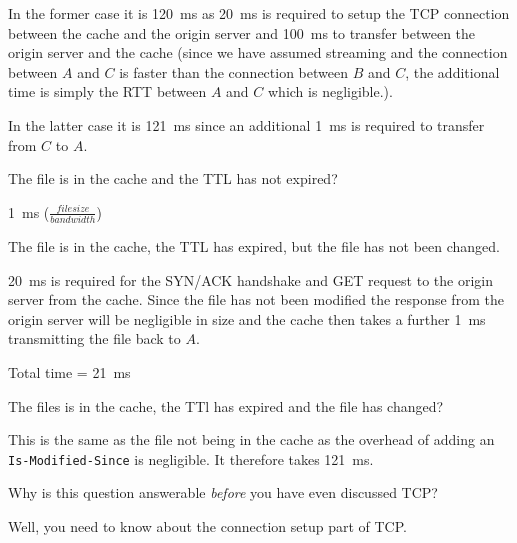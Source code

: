 \documentclass{supervision}
\begin{document}
\begin{questions}
\begin{parts}
\begin{subparts}
\begin{subsubparts}
\begin{solution}
                  In the former case it is \SI{120}{ms} as \SI{20}{ms} is
                  required to setup the TCP connection between the cache and the
                  origin server and \SI{100}{ms} to transfer between the origin
                  server and the cache (since we have assumed streaming and the
                  connection between $A$ and $C$ is faster than the connection
                  between $B$ and $C$, the additional time is simply the RTT
                  between $A$ and $C$ which is negligible.).

                  In the latter case it is \SI{121}{ms} since an additional
                  \SI{1}{ms} is required to transfer from $C$ to $A$.
                \end{solution}

              \subsubpart The file is in the cache and the TTL has not expired?
                \begin{solution}
                  \SI{1}{ms} ($\frac{{filesize}}{{bandwidth}}$)
                \end{solution}

              \subsubpart The file is in the cache, the TTL has expired, but
                the file has not been changed.
                \begin{solution}
                  \SI{20}{ms} is required for the SYN/ACK handshake and GET
                  request to the origin server from the cache. Since the file
                  has not been modified the response from the origin server will
                  be negligible in size and the cache then takes a further
                  \SI{1}{ms} transmitting the file back to $A$.

                  Total time = \SI{21}{ms}
                \end{solution}

              \subsubpart The files is in the cache, the TTl has expired and
                the file has changed?
                \begin{solution}
                  This is the same as the file not being in the cache as the
                  overhead of adding an \lstinline|Is-Modified-Since| is
                  negligible. It therefore takes \SI{121}{ms}.
                \end{solution}

            \end{subsubparts}

          \subpart Why is this question answerable \emph{before} you have even
            discussed TCP?
            \begin{solution}
              Well, you need to know about the connection setup part of TCP.
            \end{solution}


\end{subparts}
\end{parts}
\end{questions}
\end{document}

